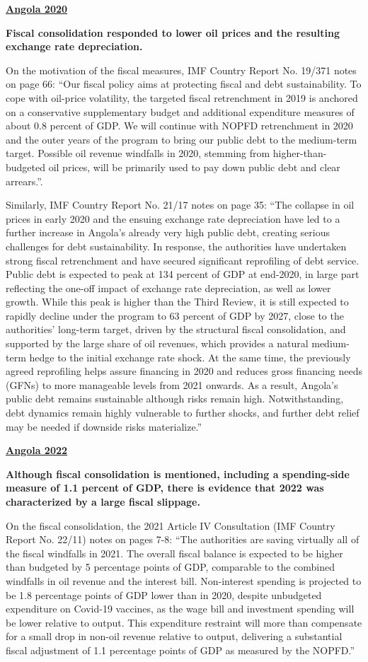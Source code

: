 \textbf{\underline{Angola 2020}}

\textbf{Fiscal consolidation responded to lower oil prices and the resulting exchange rate depreciation.}

On the motivation of the fiscal measures, IMF Country Report No. 19/371 notes on page 66: “Our fiscal policy aims at protecting fiscal and debt sustainability. To cope with oil-price volatility, the targeted fiscal retrenchment in 2019 is anchored on a conservative supplementary budget and additional expenditure measures of about 0.8 percent of GDP. We will continue with NOPFD retrenchment in 2020 and the outer years of the program to bring our public debt to the medium-term target. Possible oil revenue windfalls in 2020, stemming from higher-than-budgeted oil prices, will be primarily used to pay down public debt and clear arrears.”. 

Similarly, IMF Country Report No. 21/17 notes on page 35: “The collapse in oil prices in early 2020 and the ensuing exchange rate depreciation have led to a further increase in Angola’s already very high public debt, creating serious challenges for debt sustainability. In response, the authorities have undertaken strong fiscal retrenchment and have secured significant reprofiling of debt service. Public debt is expected to peak at 134 percent of GDP at end-2020, in large part reflecting the one-off impact of exchange rate depreciation, as well as lower growth. While this peak is higher than the Third Review, it is still expected to rapidly decline under the program to 63 percent of GDP by 2027, close to the authorities’ long-term target, driven by the structural fiscal consolidation, and supported by the large share of oil revenues, which provides a natural medium-term hedge to the initial exchange rate shock. At the same time, the previously agreed reprofiling helps assure financing in 2020 and reduces gross financing needs (GFNs) to more manageable levels from 2021 onwards. As a result, Angola’s public debt remains sustainable although risks remain high. Notwithstanding, debt dynamics remain highly vulnerable to further shocks, and further debt relief may be needed if downside risks materialize.” 

\textbf{\underline{Angola 2022}}

\textbf{Although fiscal consolidation is mentioned, including a spending-side measure of 1.1 percent of GDP, there is evidence that 2022 was characterized by a large fiscal slippage.}

On the fiscal consolidation, the 2021 Article IV Consultation (IMF Country Report No. 22/11) notes on pages 7-8: “The authorities are saving virtually all of the fiscal windfalls in 2021. The overall fiscal balance is expected to be higher than budgeted by 5 percentage points of GDP, comparable to the combined windfalls in oil revenue and the interest bill. Non-interest spending is projected to be 1.8 percentage points of GDP lower than in 2020, despite unbudgeted expenditure on Covid-19 vaccines, as the wage bill and investment spending will be lower relative to output. This expenditure restraint will more than compensate for a small drop in non-oil revenue relative to output, delivering a substantial fiscal adjustment of 1.1 percentage points of GDP as measured by the NOPFD.”

